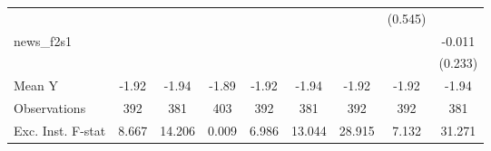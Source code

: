 {\begin{tabular}{l*{8}{c}}
            &                     &                     &                     &                     &                     &                     &     (0.545)         &                     \\
\addlinespace
news\_f2s1   &                     &                     &                     &                     &                     &                     &                     &      -0.011         \\
            &                     &                     &                     &                     &                     &                     &                     &     (0.233)         \\
\midrule
Mean Y      &       -1.92         &       -1.94         &       -1.89         &       -1.92         &       -1.94         &       -1.92         &       -1.92         &       -1.94         \\
Observations&         392         &         381         &         403         &         392         &         381         &         392         &         392         &         381         \\
Exc. Inst. F-stat&       8.667         &      14.206         &       0.009         &       6.986         &      13.044         &      28.915         &       7.132         &      31.271         \\
\bottomrule
\end{tabular}
}
